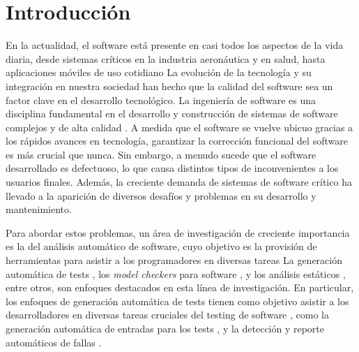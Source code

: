 \chapter[Introducción]{Introducción}
\label{cap:introduccion}



En la actualidad, el software está presente en casi todos los aspectos de la vida diaria, desde sistemas críticos en la industria aeronáutica y en salud, hasta aplicaciones móviles de uso cotidiano \cite{}  La evolución de la tecnología y su integración en nuestra sociedad han hecho que la calidad del software sea un factor clave en el desarrollo tecnológico. La ingeniería de software es una disciplina fundamental en el desarrollo y construcción de sistemas de software complejos y de alta calidad \cite{} . 
A medida que el software se vuelve ubicuo gracias a los rápidos avances en tecnología, garantizar la corrección funcional del software es más crucial que nunca. Sin embargo, a menudo sucede que el software desarrollado es defectuoso, lo que causa distintos tipos de inconvenientes a los usuarios finales.
Además, la creciente demanda de sistemas de software crítico ha llevado a la aparición de diversos desafíos y problemas en su desarrollo y mantenimiento.

Para abordar estos problemas, un área de investigación de creciente importancia es la del análisis automático de software, cuyo objetivo es la provisión de herramientas para asistir a los programadores en diversas tareas
La generación automática de tests \cite{Ponzio:2016, Rosner15, Abad13,
Galeotti:2010, Khalek:2011, Pasareanu:2010, Gligoric10, Tillmann:2008,
Pacheco07}, los \emph{model checkers} para software \cite{Visser06, Visser05,
Clarke:2004}, y los análisis estáticos \cite{Calcagno:2011, Itzhaky:2014}, entre
otros, son enfoques destacados en esta línea de investigación. En particular,
los enfoques de generación automática de tests tienen como objetivo asistir a los desarrolladores 
en diversas tareas cruciales del testing de software \cite{Ammann16,Myers11},
como la generación automática de entradas para los tests \cite{Cadar08,Christakis15,Iosif02,Luckow14,Fraser11}, 
y la detección y reporte automáticos de fallas \cite{Pacheco07, Ma15 , Godefroid05, Marinov01, Boyapati02, Godefroid12}.

